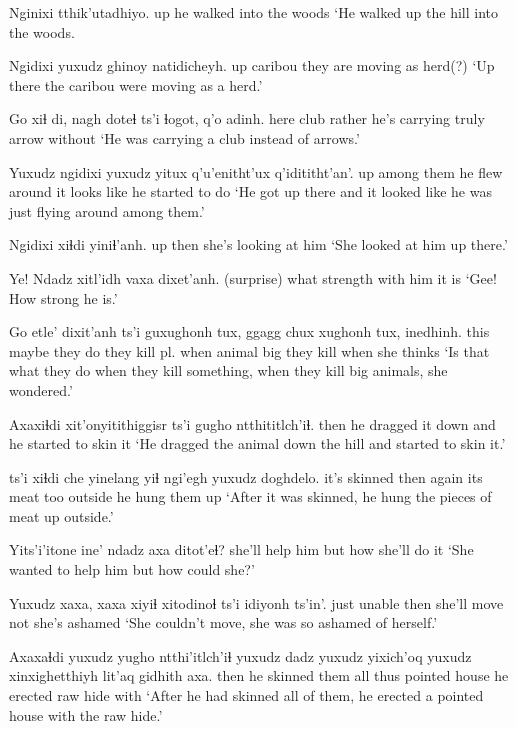 \documentclass[12pt]{article}
\begin{document}
\gll Nginixi tthik'utadhiyo.          
up      {he walked into the woods }
\glt `He walked up the hill into the woods.
\glend

\gll Ngidixi yuxudz ghinoy  natidicheyh.
up  {}           caribou {they are moving as herd(?)}
\glt `Up there the caribou were moving as a herd.'
\glend

\gll Go   xiɬ  di, nagh   doteɬ          ts'i ɬogot, q'o  adinh.
here club  {}  rather {he's carrying} {} truly arrow without
\glt `He was carrying a club instead of arrows.'
\glend

\gll Yuxudz ngidixi yuxudz yitux      q'u'enitht'ux  q'idititht'an'.
{}     up      {}     {among them} {he flew around} {it looks like he started to do}
\glt `He got up there and it looked like he was just flying around among them.'
\glend

\gll Ngidixi xiɬdi yiniɬ'anh.
up      then  {she's looking at him}
\glt `She looked at him up there.'
\glend

\gll Ye! Ndadz xitl'idh vaxa    dixet'anh. 
(surprise) what   strength  {with him} {it is}
\glt `Gee! How strong he is.'
\glend

\gll Go   etle' dixit'anh ts'i guxughonh   tux, ggagg  chux xughonh    tux,  inedhinh.
this maybe {they do} {}   {they kill pl.} when animal big  {they kill} when {she thinks}
\glt `Is that what they do when they kill something, when they kill big animals, she wondered.'
\glend

\gll Axaxiɬdi xit'onyitithiggisr    ts'i {gugho ntthititlch'iɬ}.
then     {he dragged it down} and  {he started to skin it}
\glt `He dragged the animal down the hill and started to skin it.'
\glend

 ts'i xiɬdi che yinelang yiɬ ngi'egh yuxudz doghdelo.
{it's skinned}  {} then   again   {its meat} too outside  {}   {he hung them up}
\glt `After it was skinned, he hung the pieces of meat up outside.'
\glend

\gll Yits'i'itone    ine' {ndadz axa} ditot'eɬ?
{she'll help him} but  how       {she'll do it}
\glt `She wanted to help him but how could she?'
\glend

\gll Yuxudz xaxa, xaxa xiyiɬ xitodinoɬ ts'i   idiyonh ts'in'.
just   unable {}     then      {she'll move} not {she's ashamed}
\glt `She couldn't move, she was so ashamed of herself.'
\glend

\gll Axaxaɬdi yuxudz {yugho ntthi'itlch'iɬ} yuxudz dadz yuxudz yixich'oq     yuxudz xinxighetthiyh lit'aq gidhith axa. 
then    {}     {he skinned them}     all  thus  {}      {pointed house}   {}   {he erected}     raw    hide    with
\glt `After he had skinned all of them, he erected a pointed house with the raw hide.'
\glend
\end{document}
